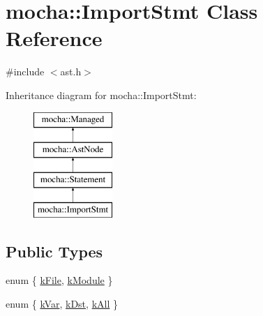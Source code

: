 \hypertarget{classmocha_1_1_import_stmt}{
\section{mocha::ImportStmt Class Reference}
\label{classmocha_1_1_import_stmt}
}


{\ttfamily \#include $<$ast.h$>$}

Inheritance diagram for mocha::ImportStmt:\begin{figure}[H]
\begin{center}
\leavevmode
\includegraphics[height=4.000000cm]{classmocha_1_1_import_stmt}
\end{center}
\end{figure}
\subsection*{Public Types}
\begin{DoxyCompactItemize}
\item 
enum \{ \hyperlink{classmocha_1_1_import_stmt_a25bd09e7f01be8b2da5d6b6dbfb8d9b3a7d782d13f797a28105093148d4b65914}{kFile}, 
\hyperlink{classmocha_1_1_import_stmt_a25bd09e7f01be8b2da5d6b6dbfb8d9b3a901d9f582740111c97dcfb1f521bd20a}{kModule}
 \}
\item 
enum \{ \hyperlink{classmocha_1_1_import_stmt_a515ad7ecac53cac114296114b30c029ca17665c51cee3d3096aa7e36c265d155e}{kVar}, 
\hyperlink{classmocha_1_1_import_stmt_a515ad7ecac53cac114296114b30c029ca1cdf70a1c9d676975579dfdb2e402d83}{kDst}, 
\hyperlink{classmocha_1_1_import_stmt_a515ad7ecac53cac114296114b30c029ca3f1607d49322fb51c680b47b9a835427}{kAll}
 \}
\end{DoxyCompactItemize}
